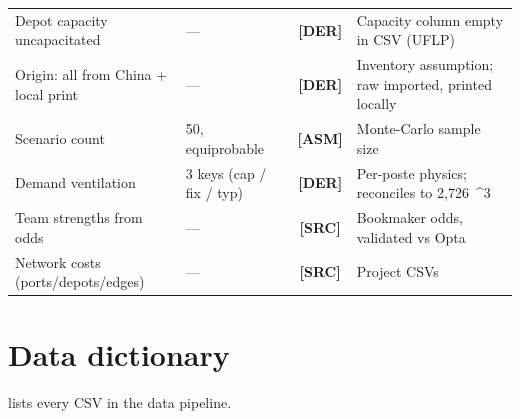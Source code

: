 \documentclass[11pt,a4paper]{article}
\numberwithin{equation}{section}
\newcommand{\mcube}{\text{m}^{3}}
\newcommand{\statusSourced}{{\color{LimeFIFA!70!NavyFIFA}\bfseries\textsf{[SRC]}}}
\newcommand{\statusDerived}{{\color{BlueFIFA}\bfseries\textsf{[DER]}}}
\newcommand{\statusAssumed}{{\color{RedFIFA}\bfseries\textsf{[ASM]}}}
\begin{document}
\begin{longtable}{@{}p{}p{}c p{}@{}}
Depot capacity uncapacitated & --- & \statusDerived{} & Capacity column empty in CSV (UFLP) \\
Origin: all from China + local print & --- & \statusDerived{} & Inventory assumption; raw imported, printed locally \\
Scenario count & 50, equiprobable & \statusAssumed{} & Monte-Carlo sample size \\
Demand ventilation & 3 keys (cap / fix / typ) & \statusDerived{} & Per-poste physics; reconciles to 2{,}726~\mcube \\
Team strengths from odds & --- & \statusSourced{} & Bookmaker odds, validated vs Opta \cite{opta_supercomputer} \\
Network costs (ports/depots/edges) & --- & \statusSourced{} & Project CSVs \\
\end{longtable}

\section{Data dictionary}\label{app:datadict}
\setcounter{figure}{0}
\setcounter{table}{0}

 lists every CSV in the data pipeline.
\end{document}
